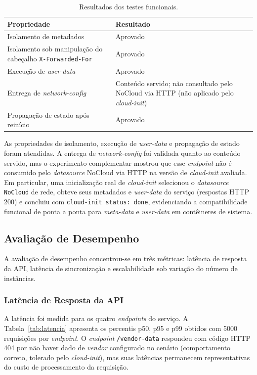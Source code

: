 \begin{table}[ht]
\centering
\caption{Resultados dos testes funcionais.}
\label{tab:funcional}
\begin{tabular}{>{\raggedright\arraybackslash}p{6.2cm} >{\raggedright\arraybackslash}p{6.4cm}}
\hline
\textbf{Propriedade} & \textbf{Resultado} \\
\hline
Isolamento de metadados & Aprovado \\
Isolamento sob manipulação do cabeçalho \texttt{X-Forwarded-For} & Aprovado \\
Execução de \textit{user-data} & Aprovado \\
Entrega de \textit{network-config} & Conteúdo servido; não consultado pelo NoCloud via HTTP (não aplicado pelo \textit{cloud-init}) \\
Propagação de estado após reinício & Aprovado \\
\hline
\end{tabular}
\end{table}

As propriedades de isolamento, execução de \textit{user-data} e propagação de estado foram atendidas. A entrega de \textit{network-config} foi validada quanto ao conteúdo servido, mas o experimento complementar mostrou que esse \textit{endpoint} não é consumido pelo \textit{datasource} NoCloud via HTTP na versão de \textit{cloud-init} avaliada. Em particular, uma inicialização real de \textit{cloud-init} selecionou o \textit{datasource} \texttt{NoCloud} de rede, obteve seus metadados e \textit{user-data} do serviço (respostas HTTP 200) e concluiu com \texttt{cloud-init status: done}, evidenciando a compatibilidade funcional de ponta a ponta para \textit{meta-data} e \textit{user-data} em contêineres de sistema.

\subsection{Avaliação de Desempenho}
\label{subsec_avaliacao_desempenho}

A avaliação de desempenho concentrou-se em três métricas: latência de resposta da API, latência de sincronização e escalabilidade sob variação do número de instâncias.

\subsubsection{Latência de Resposta da API}

A latência foi medida para os quatro \textit{endpoints} do serviço. A Tabela~\ref{tab:latencia} apresenta os percentis p50, p95 e p99 obtidos com 5000 requisições por \textit{endpoint}. O \textit{endpoint} \texttt{/vendor-data} respondeu com código HTTP 404 por não haver dado de \textit{vendor} configurado no cenário (comportamento correto, tolerado pelo \textit{cloud-init}), mas suas latências permanecem representativas do custo de processamento da requisição.


